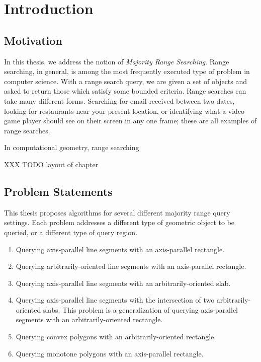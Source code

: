 \chapter{Introduction}
\label{:intro}


\section{Motivation}
\label{:introduction:motivation}

In this thesis, we address the notion of \emph{Majority Range Searching}.  Range searching, in general, is among the most frequently executed type of problem in computer science. With a range search query, we are given a set of objects and asked to return those which satisfy some bounded criteria. Range searches can take many different forms. Searching for email received between two dates, looking for restaurants near your present location, or identifying what a video game player should see on their screen in any one frame; these are all examples of range searches.

In computational geometry, range searching 

XXX TODO layout of chapter


\section{Problem Statements}
\label{:introduction:problems}

This thesis proposes algorithms for several different majority range query settings.  Each problem addresses a different type of geometric object to be queried, or a different type of query region.

\begin{enumerate}
\item Querying axis-parallel line segments with an axis-parallel rectangle.

\item Querying arbitrarily-oriented line segments with an axis-parallel rectangle.

\item Querying axis-parallel line segments with an arbitrarily-oriented slab.

\item Querying axis-parallel line segments with the intersection of two arbitrarily-oriented slabs. This problem is a generalization of querying axis-parallel segments with an arbitrarily-oriented rectangle.

\item Querying convex polygons with an arbitrarily-oriented rectangle.

\item Querying monotone polygons with an axis-parallel rectangle.
\end{enumerate}


